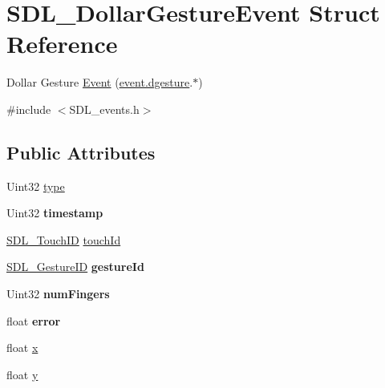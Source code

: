 \hypertarget{structSDL__DollarGestureEvent}{\section{S\+D\+L\+\_\+\+Dollar\+Gesture\+Event Struct Reference}
\label{structSDL__DollarGestureEvent}
}


Dollar Gesture \hyperlink{classEvent}{Event} (\hyperlink{unionSDL__Event_a4481167b9f8549aeb254e97ca812e74d}{event.\+dgesture}.$\ast$)  




{\ttfamily \#include $<$S\+D\+L\+\_\+events.\+h$>$}

\subsection*{Public Attributes}
\begin{DoxyCompactItemize}
\item 
Uint32 \hyperlink{structSDL__DollarGestureEvent_ac7f6948754a1b2eb36edde043bf75ce9}{type}
\item 
\hypertarget{structSDL__DollarGestureEvent_a3bccd8ebdf30b79c0f4074f6471ec583}{Uint32 {\bfseries timestamp}}\label{structSDL__DollarGestureEvent_a3bccd8ebdf30b79c0f4074f6471ec583}

\item 
\hyperlink{structUint64}{S\+D\+L\+\_\+\+Touch\+I\+D} \hyperlink{structSDL__DollarGestureEvent_a40402f6911ed0dba48e6b23aa02bd83d}{touch\+Id}
\item 
\hypertarget{structSDL__DollarGestureEvent_a68968438eae9e58208b14e8c954dec31}{\hyperlink{structUint64}{S\+D\+L\+\_\+\+Gesture\+I\+D} {\bfseries gesture\+Id}}\label{structSDL__DollarGestureEvent_a68968438eae9e58208b14e8c954dec31}

\item 
\hypertarget{structSDL__DollarGestureEvent_a14160d8bad8569f53dd18ed8f64d253f}{Uint32 {\bfseries num\+Fingers}}\label{structSDL__DollarGestureEvent_a14160d8bad8569f53dd18ed8f64d253f}

\item 
\hypertarget{structSDL__DollarGestureEvent_a30aaa8fe0df93615e6692aa20e9c13eb}{float {\bfseries error}}\label{structSDL__DollarGestureEvent_a30aaa8fe0df93615e6692aa20e9c13eb}

\item 
float \hyperlink{structSDL__DollarGestureEvent_a9888449bd8842ed96494b4db16a6097b}{x}
\item 
float \hyperlink{structSDL__DollarGestureEvent_a293b2303acc1cfc63c167c5525e6eab5}{y}
\end{DoxyCompactItemize}


